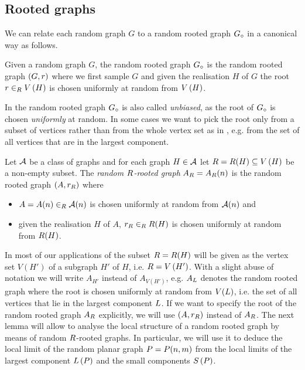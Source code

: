 \subsection{Rooted graphs}
We can relate each random graph $G$ to a random rooted graph $G_\circ$ in a canonical way as follows.
\begin{definition}\label{LSdef:unbiased}
Given a random graph $G$, the random rooted graph $G_\circ$ is the random rooted graph $\left(G, r\right)$ where we first sample $G$ and given the realisation $H$ of $G$ the root $r\in_RV\left(H\right)$ is chosen uniformly at random from $V\left(H\right)$.
\end{definition}
In \cite{BenjaminiSchramm2001} the random rooted graph $G_\circ$ is also called {\em unbiased}, as the root of $G_\circ$ is chosen {\em uniformly} at random. In some cases we want to pick the root only from a subset of vertices rather than from the whole vertex set as in , e.g. from the set of all vertices that are in the largest component. 

\begin{definition}\label{LSdef:R_rooted}
Let $\mathcal{A}$ be a class of graphs and for each graph $H\in\mathcal{A}$ let $R=R(H)\subseteq V\left(H\right)$ be a non-empty subset. The {\em random $R$-rooted graph} $A_{R}=A_{R}(n)$ is the random rooted graph $\left(A, r_{R}\right)$ where
\begin{itemize}
\item
$A=A(n)\in_R\mathcal{A}(n)$ is chosen uniformly at random from $\mathcal{A}(n)$ and
\item
given the realisation $H$ of $A$, $r_{R}\in_RR(H)$ is chosen uniformly at random from $R(H)$.
\end{itemize}
\end{definition}
In most of our applications of  the subset $R=R(H)$ will be given as the vertex set $V(H')$ of a subgraph $H'$ of $H$, i.e. $R=V\left(H'\right)$. With a slight abuse of notation we will write $A_{H'}$ instead of $A_{V(H')}$, e.g. $A_L$ denotes the random rooted graph where the root is chosen uniformly at random from $V(L)$, i.e. the set of all vertices that lie in the largest component $L$. If we want to specify the root of the random rooted graph $A_{R}$ explicitly, we will use $\left(A, r_{R}\right)$ instead of $A_{R}$. The next lemma will allow to analyse the local structure of a random rooted graph by means of random $R$-rooted graphs. In particular, we will use it to deduce the local limit of the random planar graph $P=P(n,m)$ from the local limits of the largest component $L\left(P\right)$ and the small components $S\left(P\right)$.

